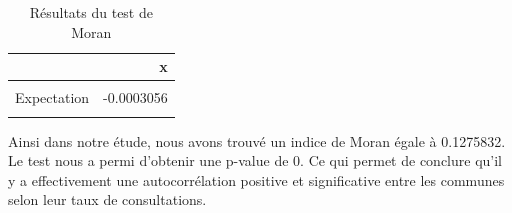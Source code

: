 \documentclass[
]{article}
\begin{document}
\begin{table}[H]
\centering
\caption{\label{tab:unnamed-chunk-16}Résultats du test de Moran}
\centering
\begin{tabular}[t]{lr}
\toprule
  & x\\
\midrule
\cellcolor{gray!10}{Moran I statistic} & \cellcolor{gray!10}{0.1275832}\\
Expectation & -0.0003056\\
\cellcolor{gray!10}{Variance} & \cellcolor{gray!10}{0.0000029}\\
\bottomrule
\end{tabular}
\end{table}

Ainsi dans notre étude, nous avons trouvé un indice de Moran égale à
0.1275832. Le test nous a permi d'obtenir une p-value de 0. Ce qui
permet de conclure qu'il y a effectivement une autocorrélation positive
et significative entre les communes selon leur taux de consultations.
\end{document}
